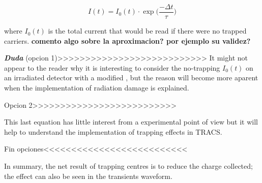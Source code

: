 \begin{equation}
	I(t) = I_0(t) \cdot \exp{\big(\frac{-\Delta t}{\tau}\big)}
 \label{eq:trapCurr}
\end{equation}

where $ I_{0}(t)$ is the total current that would be read if there were no trapped carriers. \textbf{comento algo sobre la aproximacion? por ejemplo su validez?}

\textbf{\emph{Duda}}
(opcion 1)>>>>>>>>>>>>>>>>>>>>>>>>>>>
It might not appear to the reader why it is interesting to consider the no-trapping $I_0(t)$ on an irradiated detector with a modified \neff, but the reason will become more aparent when the implementation of radiation damage is explained. 

Opcion 2>>>>>>>>>>>>>>>>>>>>>>>>>>

This last equation has little interest from a experimental point of view but it will help to understand the implementation of trapping effects in TRACS. 

Fin opciones<<<<<<<<<<<<<<<<<<<<<<<<<<

In summary, the net result of trapping centres is to reduce the charge collected; the effect can also be seen in the transients waveform.

